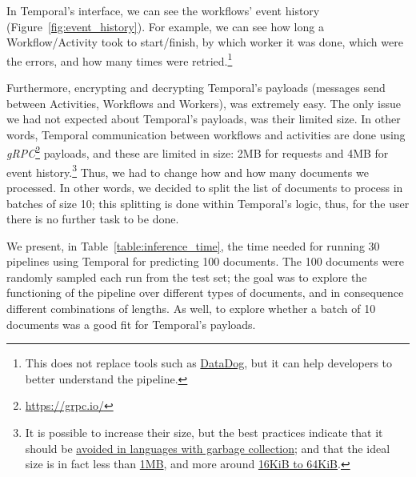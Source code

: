 \documentclass[11pt]{article}
\begin{document}
    In Temporal's interface, we can see the workflows' event history (Figure~\ref{fig:event_history}). For example, we can see how long a Workflow/Activity took to start/finish, by which worker it was done, which were the errors, and how many times were retried.\footnote{This does not replace tools such as \href{https://www.datadoghq.com/}{DataDog}, but it can help developers to better understand the pipeline.}

    Furthermore, encrypting and decrypting Temporal's payloads (messages send between Activities, Workflows and Workers), was extremely easy. The only issue we had not expected about Temporal's payloads, was their limited size. In other words, Temporal communication between workflows and activities are done using \textit{gRPC}\footnote{\href{https://grpc.io/}{https://grpc.io/}} payloads, and these are limited in size: 2MB for requests and 4MB for event history.\footnote{It is possible to increase their size, but the best practices indicate that it should be \href{https://kreya.app/blog/grpc-best-practices/\#large-messages}{avoided in languages with garbage collection}; and that the ideal size is in fact less than \href{https://github.com/grpc/grpc-java/issues/1676}{1MB}, and more around \href{https://github.com/grpc/grpc.github.io/issues/371}{16KiB to 64KiB}.} Thus, we had to change how and how many documents we processed. In other words, we decided to split the list of documents to process in batches of size 10; this splitting is done within Temporal's logic, thus, for the user there is no further task to be done. 

    We present, in Table~\ref{table:inference_time}, the time needed for running 30 pipelines using Temporal for predicting 100 documents. The 100 documents were randomly sampled each run from the test set; the goal was to explore the functioning of the pipeline over different types of documents, and in consequence different combinations of lengths. As well, to explore whether a batch of 10 documents was a good fit for Temporal's payloads.

    
\begin{table}[t]
    \centering
    \caption{Distribution of the time needed to run 30 Temporal pipelines. Each run processed 100 randomly sampled documents. Inference was done over a CPU server.}
	\label{table:inference_time}
\end{table}
\end{document}
